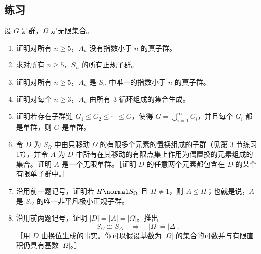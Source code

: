 \subsection*{练习}
设 $G$ 是群，$\Omega$ 是无限集合。
\begin{enumerate}[label=\arabic*.]
  \item 证明对所有 $n\geq5$，$A_n$ 没有指数小于 $n$ 的真子群。
  \item 求对所有 $n\geq5$，$S_n$ 的所有正规子群。
  \item 证明对所有 $n\geq5$，$A_n$ 是 $S_n$ 中唯一的指数小于 $n$ 的真子群。
  \item 证明对每个 $n\geq3$，$A_n$ 由所有 $3$-循环组成的集合生成。
  \item 证明若存在子群链 $G_1\leq G_2\leq\cdots\leq G$，使得 $G=\bigcup_{i=1}^{\infty}G_i$，并且每个 $G_i$ 都是单群，则 $G$ 是单群。
  \item 令 $D$ 为 $S_\Omega$ 中由只移动 $\Omega$ 的有限多个元素的置换组成的子群（见第 3 节练习 17），并令 $A$ 为 $D$ 中所有在其移动的有限点集上作用为偶置换的元素组成的集合。证明 $A$ 是一个无限单群。［证明 $D$ 的任意两个元素都包含在 $D$ 的某个有限单子群中。］
  \item 沿用前一题记号，证明若 $H\normal S_\Omega$ 且 $H\neq1$，则 $A\leq H$；也就是说，$A$ 是 $S_\Omega$ 的唯一非平凡极小正规子群。
  \item 沿用前两题记号，证明 $|D|=|A|=|\Omega|$。推出
  \[
    S_\Omega\cong S_\Delta\quad\Longrightarrow\quad |\Omega|=|\Delta|.
  \]
  ［用 $D$ 由换位生成的事实。你可以假设基数为 $|\Omega|$ 的集合的可数并与有限直积仍具有基数 $|\Omega|$。］
\end{enumerate}
